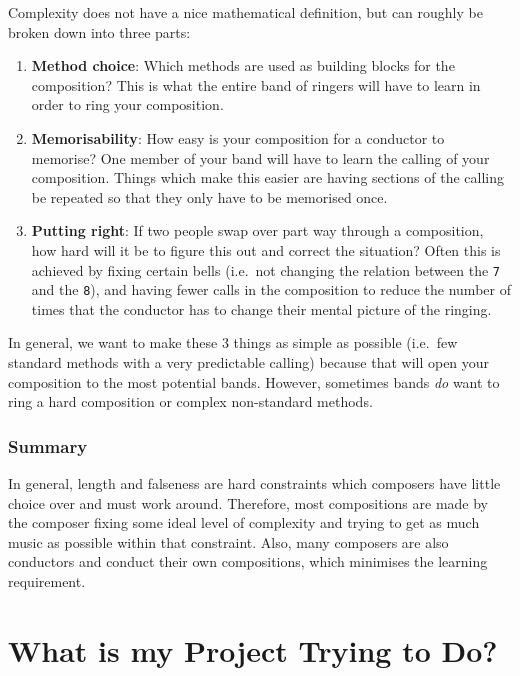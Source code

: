 \documentclass[12pt]{article}
\newcommand{\row}[1]{\texttt{#1}}
\begin{document}
Complexity does not have a nice mathematical definition, but can roughly be broken down into three
parts:

\begin{enumerate}
    \item \textbf{Method choice}: Which methods are used as building blocks for the composition?
        This is what the entire band of ringers will have to learn in order to ring your
        composition.
    \item \textbf{Memorisability}: How easy is your composition for a conductor to memorise?  One
        member of your band will have to learn the calling of your composition.  Things which make
        this easier are having sections of the calling be repeated so that they only have to be
        memorised once.
    \item \textbf{Putting right}: If two people swap over part way through a composition, how hard
        will it be to figure this out and correct the situation?  Often this is achieved by fixing
        certain bells (i.e.\ not changing the relation between the \row{7} and the \row{8}), and
        having fewer calls in the composition to reduce the number of times that the conductor has
        to change their mental picture of the ringing.
\end{enumerate}

In general, we want to make these 3 things as simple as possible (i.e.\ few standard methods with a
very predictable calling) because that will open your composition to the most potential bands.
However, sometimes bands \emph{do} want to ring a hard composition or complex non-standard methods.

\subsubsection{Summary}

In general, length and falseness are hard constraints which composers have little choice over and
must work around.  Therefore, most compositions are made by the composer fixing some ideal level of
complexity and trying to get as much music as possible within that constraint.  Also, many composers
are also conductors and conduct their own compositions, which minimises the learning requirement.



\section{What is my Project Trying to Do?}
\end{document}

